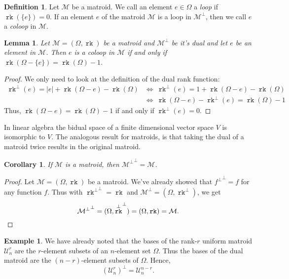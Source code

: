 \documentclass[12pt,a4paper, twoside, autooneside=false]{scrartcl}
\newtheorem{lemma}[theorem]{Lemma}
\newtheorem{korollar}[theorem]{Corollary}
\theoremstyle{definition}
\newtheorem{definition}[theorem]{Definition}
\newtheorem{beispiel}[theorem]{Example}
\theoremstyle{remark}
\numberwithin{equation}{section}
\DeclareMathOperator{\rk}{\mathtt{rk}}
\newcommand{\M}{\mathcal{M}} %
\begin{document}
\begin{definition}
Let $\M$ be a matroid. We call an element $e \in \Omega $ a \textit{loop} if $\rk(\{e\}) = 0$. If an element $e$ of the matroid $\M$ is a loop in $\M^\perp$, then we call $e$ a \textit{coloop} in $\M$.
\end{definition}
\begin{lemma}
Let $\M = (\Omega, \rk)$ be a matroid and $\M^\perp$ be it's dual and let $e$ be an element in $\M$. Then $e$ is a coloop in $\M$ if and only if $\rk(\Omega - \{e\}) = \rk(\Omega) - 1$.
\end{lemma}
\begin{proof}
We only need to look at the definition of the dual rank function: 
\begin{align*}
\rk^\perp(e) = |e| + \rk(\Omega - e) - \rk(\Omega) &\Longleftrightarrow \ \rk^\perp(e) = 1 + \rk(\Omega - e) - \rk(\Omega)\\ 
&\Longleftrightarrow \ \rk(\Omega - e) - \rk^\perp(e) = \rk(\Omega) - 1
\end{align*}
Thus, $\rk(\Omega - e) = \rk(\Omega) - 1$ if and only if $\rk^\perp(e) = 0$. 
\end{proof}
In linear algebra the bidual space of a finite dimensional vector space $V$ is isomorphic to $V$. The analogous result for matroids, is that taking the dual of a matroid twice results in the original matroid.
\begin{korollar}
If $\M$ is a matroid, then ${\M^\perp}^\perp = \M$.
\end{korollar}
\begin{proof}
Let $\M = (\Omega, \rk)$ be a matroid. We've already showed that ${f^\perp}^\perp = f$ for any function $f$. Thus with ${\rk^\perp}^\perp = \rk$ and $\M^\perp = (\Omega, \rk^\perp)$, we get 
\[
{\M^\perp}^\perp = (\Omega, {\rk^\perp}^\perp) = (\Omega, \rk) = \M. \qedhere
\]
\end{proof}
\begin{beispiel}
We have already noted that the bases of the rank-$r$ uniform matroid $\mathcal{U}_n^r$ are the $r$-element subsets of an $n$-element set $\Omega$. Thus the bases of the dual matroid are the $(n-r)$-element subsets of $\Omega$. Hence,
\[
\left(\mathcal{U}_n^r\right)^\perp = \mathcal{U}_n^{n -r}.
\]
\end{beispiel}
\end{document}
